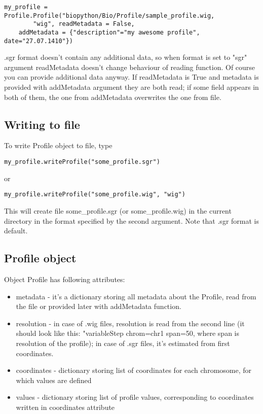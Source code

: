 \documentclass[a4paper,11pt,portrait]{article}
\begin{document}
\begin{verbatim}
my_profile = Profile.Profile("biopython/Bio/Profile/sample_profile.wig,
		"wig", readMetadata = False,
	addMetadata = {"description"="my awesome profile", date="27.07.1410"})
\end{verbatim}

.sgr format doesn't contain any additional data,
 so when format is set to "sgr" argument readMetadata doesn't change behaviour of reading function.
 Of course you can provide additional data anyway.
 If readMetadata is True and metadata is provided with addMetadata argument
 they are both read;
 if some field appears in both of them,
 the one from addMetadata overwrites the one from file.

\subsection{Writing to file}

To write Profile object to file, type

\begin{verbatim}
my_profile.writeProfile("some_profile.sgr")
\end{verbatim}

or

\begin{verbatim}
my_profile.writeProfile("some_profile.wig", "wig")
\end{verbatim}

This will create file some\_profile.sgr (or some\_profile.wig) in the current directory
 in the format specified by the second argument.
 Note that .sgr format is default.


\subsection{Profile object}

Object Profile has following attributes:

	\begin{itemize}

		\item metadata - it's a dictionary storing all metadata about the Profile,
			read from the file or provided later with addMetadata function.
		\item resolution - in case of .wig files,
			resolution is read from the second line
			(it should look like this: "variableStep chrom=chr1 span=50,
			where span is resolution of the profile);
			in case of .sgr files,
			it's estimated from first coordinates.
		\item coordinates - dictionary storing list of coordinates
			for each chromosome,
			for which values are defined
		\item values - dictionary storing list of profile values,
			corresponding to coordinates written in coordinates attribute

	\end{itemize}
\end{document}
